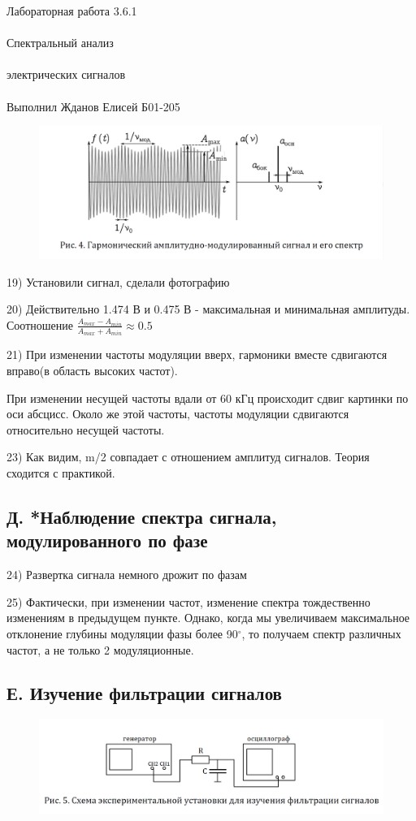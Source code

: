 \documentclass{astroedu-lab}
\begin{document}
\begin{problem}{\huge Лабораторная работа 3.6.1\\\\Спектральный анализ\\\\электрических сигналов\\\\Выполнил Жданов Елисей Б01-205}
\begin{figure}[!h]
	\centering
	\includegraphics[width=1\textwidth]{im/4.png}
	\label{fig:boiler}
\end{figure}

19) Установили сигнал, сделали фотографию

20) Действительно 1.474 В и 0.475 В - максимальная и минимальная амплитуды. Соотношение $\frac{A_{max} - A_{min}}{A_{max} + A_{min}} \approx 0.5$ 

21) При изменении частоты модуляции вверх, гармоники вместе сдвигаются вправо(в область высоких частот).

При изменении несущей частоты вдали от 60 кГц происходит сдвиг картинки по оси абсцисс. Около же этой частоты, частоты модуляции сдвигаются относительно несущей частоты.

23) Как видим, m/2 совпадает с отношением амплитуд сигналов. Теория сходится с практикой.

\subsection{Д. *Наблюдение спектра сигнала, модулированного по фазе}

24) Развертка сигнала немного дрожит по фазам

25) Фактически, при изменении частот, изменение спектра тождественно изменениям в предыдущем пункте. Однако, когда мы увеличиваем максимальное отклонение глубины модуляции фазы более 90$^\circ$, то получаем спектр различных частот, а не только 2 модуляционные.

\subsection{Е. Изучение фильтрации сигналов}

\begin{figure}[!h]
	\centering
	\includegraphics[width=1\textwidth]{im/5.png}
	\label{fig:boiler}
\end{figure}


\end{problem}
\end{document}
